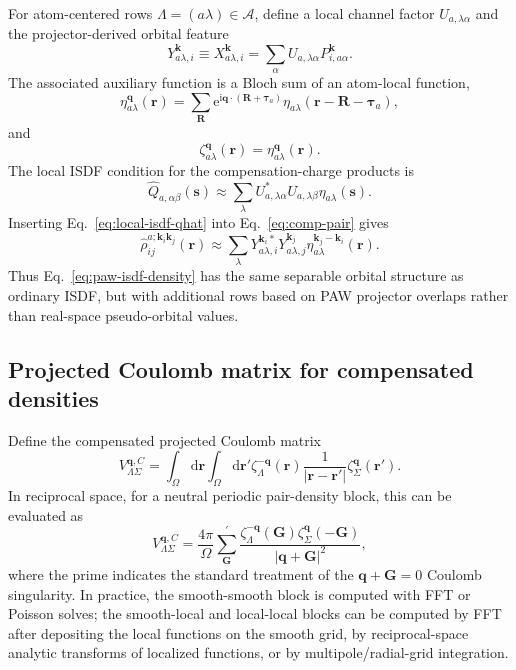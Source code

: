 \documentclass[aps,prb,reprint,superscriptaddress,longbibliography,nofootinbib]{revtex4-2}
\newcommand{\br}{\mathbf r}
\newcommand{\bR}{\mathbf R}
\newcommand{\bG}{\mathbf G}
\newcommand{\bk}{\mathbf k}
\newcommand{\bq}{\mathbf q}
\newcommand{\btau}{\boldsymbol\tau}
\newcommand{\dd}{\mathrm d}
\newcommand{\ee}{\mathrm e}
\newcommand{\ii}{\mathrm i}
\newcommand{\cell}{\Omega}
\begin{document}
For atom-centered rows \(\Lambda=(a\lambda)\in\mathcal A\), define a local channel factor \(U_{a,\lambda\alpha}\) and the projector-derived orbital feature
\begin{equation}
Y_{a\lambda,i}^{\bk}
\equiv
X_{a\lambda,i}^{\bk}
=
\sum_\alpha U_{a,\lambda\alpha}P_{i,a\alpha}^{\bk}.
\label{eq:y-feature}
\end{equation}
The associated auxiliary function is a Bloch sum of an atom-local function,
\begin{equation}
\eta_{a\lambda}^{\bq}(\br)
=
\sum_{\bR}\ee^{\ii\bq\cdot(\bR+\btau_a)}
\eta_{a\lambda}(\br-\bR-\btau_a),
\label{eq:local-bloch-eta}
\end{equation}
and
\begin{equation}
\zeta_{a\lambda}^{\bq}(\br)=\eta_{a\lambda}^{\bq}(\br).
\label{eq:local-zeta}
\end{equation}
The local ISDF condition for the compensation-charge products is
\begin{equation}
\widehat Q_{a,\alpha\beta}(\mathbf s)
\approx
\sum_\lambda
U_{a,\lambda\alpha}^*U_{a,\lambda\beta}
\eta_{a\lambda}(\mathbf s).
\label{eq:local-isdf-qhat}
\end{equation}
Inserting Eq.~\eqref{eq:local-isdf-qhat} into Eq.~\eqref{eq:comp-pair} gives
\begin{equation}
\widehat\rho_{ij}^{a;\bk_i\bk_j}(\br)
\approx
\sum_\lambda
Y_{a\lambda,i}^{\bk_i *}Y_{a\lambda,j}^{\bk_j}
\eta_{a\lambda}^{\bk_j-\bk_i}(\br).
\label{eq:comp-rho-local-isdf}
\end{equation}
Thus Eq.~\eqref{eq:paw-isdf-density} has the same separable orbital structure as ordinary ISDF, but with additional rows based on PAW projector overlaps rather than real-space pseudo-orbital values.

\subsection{Projected Coulomb matrix for compensated densities}

Define the compensated projected Coulomb matrix
\begin{equation}
V_{\Lambda\Sigma}^{\bq,C}
=
\int_{\cell}\dd\br\int_{\cell}\dd\br'
\zeta_\Lambda^{-\bq}(\br)
\frac{1}{|\br-\br'|}
\zeta_\Sigma^{\bq}(\br').
\label{eq:v-composite-coulomb}
\end{equation}
In reciprocal space, for a neutral periodic pair-density block, this can be evaluated as
\begin{equation}
V_{\Lambda\Sigma}^{\bq,C}
=\frac{4\pi}{\Omega}
\sum_{\bG}^{'}
\frac{
\zeta_{\Lambda}^{-\bq}(\bG)
\zeta_{\Sigma}^{\bq}(-\bG)
}{|\bq+\bG|^2},
\label{eq:v-reciprocal}
\end{equation}
where the prime indicates the standard treatment of the \(\bq+\bG=0\) Coulomb singularity.  In practice, the smooth-smooth block is computed with FFT or Poisson solves; the smooth-local and local-local blocks can be computed by FFT after depositing the local functions on the smooth grid, by reciprocal-space analytic transforms of localized functions, or by multipole/radial-grid integration.
\end{document}
